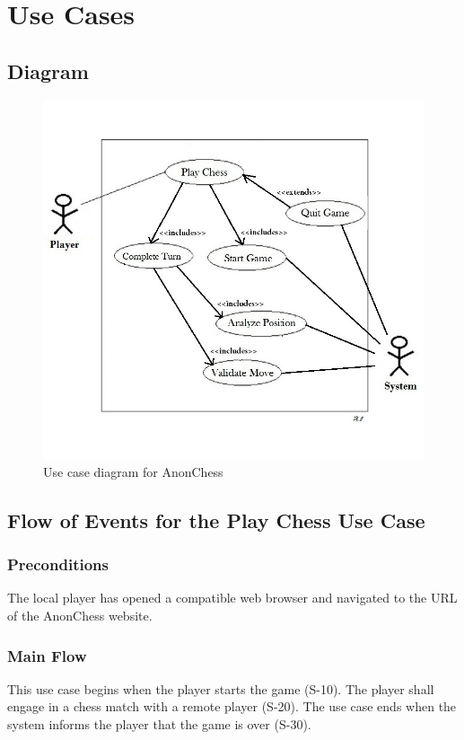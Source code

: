 \section{Use Cases}
\subsection{Diagram}
\begin{figure}[H]
   \centering
   \includegraphics[scale=0.5]{usecase.jpg}
   \caption{Use case diagram for AnonChess}
  \end{figure}
\subsection{Flow of Events for the Play Chess Use Case}
\label{playchess}
\subsubsection{Preconditions}
The local player has opened a compatible web browser and navigated to the URL of the AnonChess website.
\subsubsection{Main Flow}
This use case begins when the player starts the game (S-10). The player shall engage in a chess match with a remote player (S-20). The use case ends when the system informs the player that the game is over (S-30).
